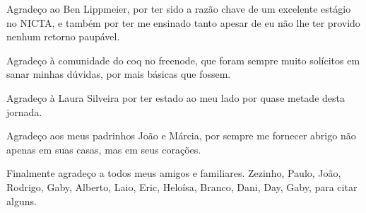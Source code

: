 \documentclass[bacharelado]{unb-cic}
\theoremstyle{definition}
\theoremstyle{definition}
\begin{document}
\begin{agradecimentos}
    Agradeço ao Ben Lippmeier, por ter sido a razão chave de um excelente estágio
    no NICTA, e também por ter me ensinado tanto apesar de eu não lhe ter provido nenhum retorno paupável. 

    Agradeço à comunidade do coq no freenode, que foram sempre muito solícitos em
    sanar minhas dúvidas, por mais básicas que fossem.

    Agradeço à Laura Silveira por ter estado ao meu lado por quase metade desta jornada.

    Agradeço aos meus padrinhos João e Márcia, por sempre me fornecer abrigo não apenas em suas casas, mas em seus corações.

    Finalmente agradeço a todos meus amigos e familiares. Zezinho, Paulo, 
    João, Rodrigo, Gaby, Alberto, Laio, Eric, Heloísa, Branco, Dani, Day, Gaby, para citar alguns.
  \end{agradecimentos}


  
  \tableofcontents
  \printglossary
  \listoffigures
  \listoftables

  \textual    
  
  
  
  
  
  
  


  \postextual
  
  
\end{document}
